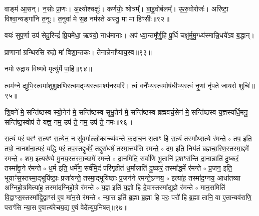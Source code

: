 वाङ्म॑ आ॒सन्। 
न॒सोः प्रा॒णः। 
अ॒क्ष्योश्चक्षुः॑। 
कर्ण॑योः॒ श्रोत्रम्᳚। 
बा॒हु॒वोर्बलम्᳚। 
ऊ॒रु॒वोरोजः॑। 
अरि॑ष्टा॒ विश्वा॒न्यङ्गा॑नि त॒नूः। 
त॒नुवा॑ मे स॒ह नम॑स्ते अस्तु॒ मा मा॑ हिꣳसीः॥९२॥\anuvakamend

वयः॑ सुप॒र्णा उप॑ सेदु॒रिन्द्रं॑ प्रि॒यमे॑धा॒ ऋष॑यो॒ नाध॑मानाः। 
अप॑ ध्वा॒न्तमू᳚र्णु॒हि पू॒र्धि चक्षु॑र्मुमु॒ग्ध्य॑स्मान्नि॒धये॑ऽव ब॒द्धान्।\anuvakamend

प्राणानां ग्रन्थिरसि रुद्रो मा॑ विशा॒न्तकः। 
तेनान्नेना᳚प्या\-य॒स्व॥९३॥\anuvakamend

नमो रुद्राय विष्णवे मृत्यु॑र्मे पा॒हि॥९४॥\anuvakamend


त्वम॑ग्ने॒ द्युभि॒स्त्वमा॑शुशु॒क्षणि॒स्त्वम॒द्भ्यस्त्वमश्म॑न॒स्परि॑। 
त्वं वने᳚भ्य॒स्त्वमोष॑धीभ्य॒स्त्वं नृ॒णां नृ॑पते जायसे॒ शुचिः॑॥९५॥\anuvakamend

शि॒वने॑ मे॒ सन्ति॑ष्ठस्व स्यो॒नेन॑  मे॒ सन्ति॑ष्ठस्व सुभू॒तेन॑  मे॒ सन्ति॑ष्ठस्व ब्रह्मवर्च॒सेन॑  मे॒ सन्ति॑ष्ठस्व य॒ज्ञस्यर्धि॒मनु॒ सन्ति॑ष्ठ॒स्वोप॑ ते यज्ञ॒ नम॒ उप॑ ते॒ नम॒ उप॑ ते॒ नमः॑॥९६॥\anuvakamend

\newcommand{\sep}{{\small$\circ$} }
स॒त्यं परं॒ परꣳ॑ स॒त्यꣳ स॒त्येन॒ न सु॑व॒र्गाल्लो॒काच्च्य॑वन्ते क॒दाच॒न स॒ताꣳ हि स॒त्यं तस्मा᳚थ्स॒त्ये र॑मन्ते॒ \sep
तप॒ इति॒ तपो॒ नानश॑ना॒त्परं॒ यद्धि परं॒ तप॒स्तद्दुर्ध॑र्\mbox{}षं॒ तद्दुरा॑धर्\mbox{}षं॒ तस्मा॒त्तप॑सि रमन्ते॒ \sep
दम॒ इति॒ निय॑तं ब्रह्मचा॒रिण॒स्तस्मा॒द्दमे॑ रमन्ते॒ \sep
शम॒ इत्यर॑ण्ये मु॒नय॒स्तस्मा॒च्छमे॑ रमन्ते \sep
दा॒नमिति॒ सर्वा॑णि भू॒तानि॑ प्र॒शꣳस॑न्ति दा॒नान्नाति॑ दु॒ष्करं॒ तस्मा᳚द्दा॒ने र॑मन्ते \sep
ध॒र्म इति॒ धर्मे॑ण॒ सर्व॑मि॒दं परि॑गृहीतं ध॒र्मान्नाति॑ दु॒ष्करं॒ तस्मा᳚द्ध॒र्मे र॑मन्ते \sep
प्र॒जन॒ इति॒ भूयाꣳ॑स॒स्तस्मा॒द्भूयि॑ष्ठाः॒ प्रजा॑यन्ते॒ तस्मा॒द्भूयि॑ष्ठाः प्र॒जन॑ने रमन्ते॒ऽग्नय॒ \sep
इत्या॑ह॒ तस्मा॑द॒ग्नय॒ आधा॑तव्या अग्निहो॒त्रमित्या॑ह॒ तस्मा॑दग्निहो॒त्रे र॑मन्ते \sep
य॒ज्ञ इति॑ य॒ज्ञो हि दे॒वास्तस्मा᳚द्य॒ज्ञे र॑मन्ते \sep
मान॒समिति॑ वि॒द्वाꣳस॒स्तस्मा᳚द्वि॒द्वाꣳस॑ ए॒व मा॑न॒से र॑मन्ते \sep
न्या॒स इति॑ ब्र॒ह्मा ब्र॒ह्मा हि परः॒ परो॑ हि ब्र॒ह्मा तानि॒ वा ए॒तान्यव॑राणि॒ पराꣳ॑सि न्या॒स ए॒वात्य॑रेचय॒द्य ए॒वं वेदे᳚त्युप॒निषत्॥९७॥
\anuvakamend


